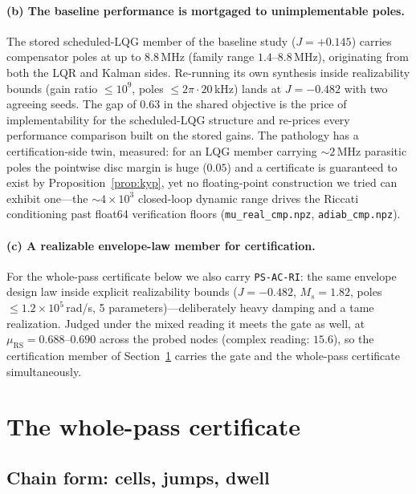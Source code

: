 \documentclass[preprint,12pt]{elsarticle}
\newcommand{\muRS}{\mu_{\mathrm{RS}}}
\begin{document}
\paragraph{(b) The baseline performance is mortgaged to unimplementable
poles.}  The stored scheduled-LQG member of the baseline study
($J = +0.145$) carries compensator poles at up to $8.8$\,MHz (family
range $1.4$--$8.8$\,MHz), originating from both the LQR and Kalman
sides.  Re-running its own synthesis inside realizability bounds
(gain ratio $\le 10^{9}$, poles $\le 2\pi\cdot20$\,kHz) lands at
$J = -0.482$ with two agreeing seeds.  The gap of $0.63$ in the shared
objective is the price of implementability for the scheduled-LQG
structure and re-prices every performance comparison built on the
stored gains.  The pathology has a certification-side twin, measured:
for an LQG member carrying ${\sim}2$\,MHz parasitic poles the
pointwise disc margin is huge ($0.05$) and a certificate is guaranteed
to exist by Proposition~\ref{prop:kyp}, yet no floating-point
construction we tried can exhibit one---the
${\sim}4{\times}10^{3}$ closed-loop dynamic range drives the Riccati
conditioning past float64 verification floors
(\texttt{mu\_real\_cmp.npz}, \texttt{adiab\_cmp.npz}).

\paragraph{(c) A realizable envelope-law member for certification.}
For the whole-pass certificate below we also carry \texttt{PS-AC-RI}:
the same envelope design law inside explicit realizability bounds
($J=-0.482$, $M_s = 1.82$, poles $\le 1.2\times10^{5}$\,rad/s,
5 parameters)---deliberately heavy damping and a tame realization.
Judged under the mixed reading it meets the gate as well, at
$\muRS = 0.688$--$0.690$ across the probed nodes (complex reading:
$15.6$), so the certification member of Section~\ref{sec:pass}
carries the gate and the whole-pass certificate simultaneously.

\section{The whole-pass certificate}
\label{sec:pass}

\subsection{Chain form: cells, jumps, dwell}
\end{document}
